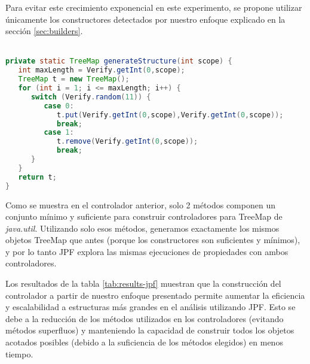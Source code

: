 Para evitar este crecimiento exponencial en este experimento, se propone utilizar únicamente los constructores detectados por nuestro enfoque explicado en la sección \ref{sec:builders}.
\\
\\
\begin{lstlisting}[caption={Controlador con métodos constructores},label={lst:driverBLD},language=Java,captionpos=b]
private static TreeMap generateStructure(int scope) {
   int maxLength = Verify.getInt(0,scope);
   TreeMap t = new TreeMap();
   for (int i = 1; i <= maxLength; i++) {
      switch (Verify.random(11)) {
         case 0:
            t.put(Verify.getInt(0,scope),Verify.getInt(0,scope));
            break;
         case 1:
            t.remove(Verify.getInt(0,scope));
            break;						
      }
   }
   return t;
}
\end{lstlisting}

Como se muestra en el controlador anterior, solo 2 métodos componen un conjunto mínimo y suficiente para construir controladores para TreeMap de \textit{java.util}. Utilizando solo esos métodos, generamos exactamente los mismos objetos TreeMap que antes (porque los constructores son suficientes y mínimos), y por lo tanto JPF explora las mismas ejecuciones de propiedades con ambos controladores.

Los resultados de la tabla \ref{tab:results-jpf} muestran que la construcción del controlador a partir de nuestro enfoque presentado permite aumentar la eficiencia y escalabilidad a estructuras más grandes en el análisis utilizando JPF. Esto se debe a la reducción de los métodos utilizados en los controladores (evitando métodos superfluos) y manteniendo la capacidad de construir todos los objetos acotados posibles (debido a la suficiencia de los métodos elegidos) en menos tiempo.




